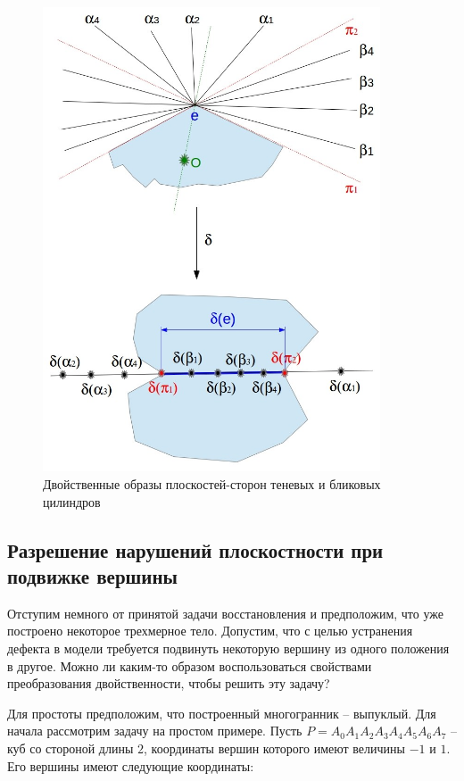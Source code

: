 \documentclass[a4paper, 12pt, titlepage]{article}
\theoremstyle{definition}
\theoremstyle{plain}
\theoremstyle{plain}
\begin{document}
\begin{figure}[ht]
 \includegraphics[width=10cm]{images/DualShadowBlinkSides.jpg}
 \caption{Двойственные образы плоскостей-сторон теневых и бликовых цилиндров}
 \label{DualShadowBlinkSides}
\end{figure}

\newpage
\subsection{Разрешение нарушений плоскостности при подвижке вершины}
\label{sec:primal-dual-problems:planarity-recovery}

Отступим немного от принятой задачи восстановления и предположим, что уже
построено некоторое трехмерное тело. Допустим, что с целью устранения дефекта в
модели требуется подвинуть некоторую вершину из одного положения в другое.
Можно ли каким-то образом воспользоваться свойствами преобразования
двойственности, чтобы решить эту задачу?

Для простоты предположим, что построенный многогранник -- выпуклый. Для начала
рассмотрим задачу на простом примере. Пусть
$P = A_{0} A_{1} A_{2} A_{3} A_{4} A_{5} A_{6} A_{7}$ -- куб со
стороной длины $2$, координаты вершин которого имеют величины $-1$ и $1$. Его
вершины имеют следующие координаты:
\end{document}
